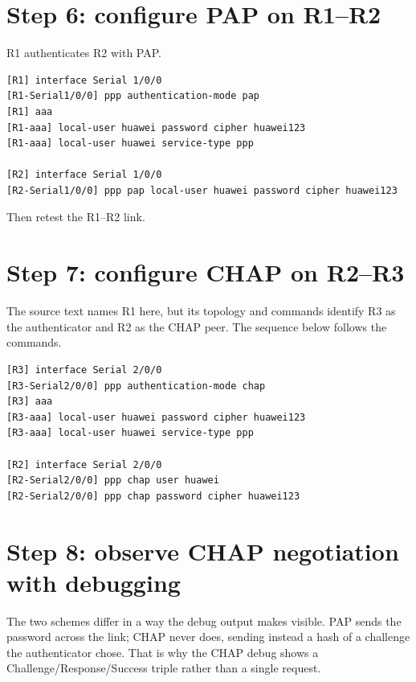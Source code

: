 \section{Step 6: configure PAP on R1--R2}
R1 authenticates R2 with PAP.
\begin{lstlisting}[style=dcnterminal]
[R1] interface Serial 1/0/0
[R1-Serial1/0/0] ppp authentication-mode pap
[R1] aaa
[R1-aaa] local-user huawei password cipher huawei123
[R1-aaa] local-user huawei service-type ppp

[R2] interface Serial 1/0/0
[R2-Serial1/0/0] ppp pap local-user huawei password cipher huawei123
\end{lstlisting}
Then retest the R1--R2 link.

\section{Step 7: configure CHAP on R2--R3}
The source text names R1 here, but its topology and commands identify R3 as the authenticator and R2 as the CHAP peer. The sequence below follows the commands.

\begin{lstlisting}[style=dcnterminal]
[R3] interface Serial 2/0/0
[R3-Serial2/0/0] ppp authentication-mode chap
[R3] aaa
[R3-aaa] local-user huawei password cipher huawei123
[R3-aaa] local-user huawei service-type ppp

[R2] interface Serial 2/0/0
[R2-Serial2/0/0] ppp chap user huawei
[R2-Serial2/0/0] ppp chap password cipher huawei123
\end{lstlisting}

\section{Step 8: observe CHAP negotiation with debugging}

The two schemes differ in a way the debug output makes visible. PAP
sends the password across the link; CHAP never does, sending instead a
hash of a challenge the authenticator chose. That is why the CHAP debug
shows a Challenge/Response/Success triple rather than a single request.

